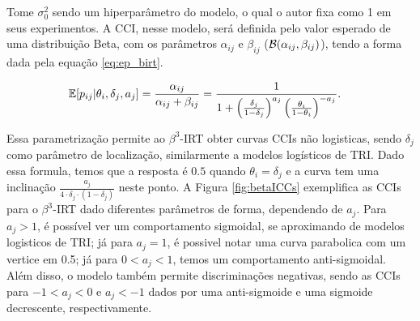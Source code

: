 \noindent Tome $\sigma_0^{2}$ sendo um hiperparâmetro do modelo, o qual o autor fixa como 1 em seus experimentos. A \gls{CCI}, nesse modelo, será definida pelo valor esperado de uma distribuição Beta, com os parâmetros $\alpha_{ij}$ e $\beta_{ij}$ (${\mathcal{B}}(\alpha_{ij}, \beta_{ij})$), tendo a forma dada pela equação \ref{eq:ep_birt}.


\begin{equation}\label{eq:ep_birt}
    \begin{split}
        {\mathbb{E}}[p_{ij}|\theta_i,\delta_j,a_j] &= \frac{\alpha_{ij}}{\alpha_{ij}+\beta_{ij}} 
        = \frac{1}{1+\left(\frac{\delta_j}{1-\delta_j}\right)^{a_j} \left(\frac{\theta_i}{1-\theta_i}\right)^{-a_j}}.
    \end{split}
\end{equation}

Essa parametrização permite ao $\beta^3$-\gls{IRT} obter curvas \gls{CCI}s não logisticas, sendo $\delta_j$ como parâmetro de localização, similarmente a modelos logísticos de \gls{TRI}. Dado essa formula, temos que a resposta é $0.5$ quando $\theta_i = \delta_j$ e a curva tem uma inclinação $\frac{a_j}{4\cdot \delta_j \cdot (1 - \delta_j)}$ neste ponto. A Figura \ref{fig:betaICCs} exemplifica as \gls{CCI}s para o $\beta^3$-\gls{IRT} dado diferentes parâmetros de forma, dependendo de $a_j$. Para $a_j > 1$, é possível ver um comportamento sigmoidal, se aproximando de modelos logisticos de \gls{TRI}; já para $a_j = 1$, é possivel notar uma curva parabolica com um vertice em 0.5; já para $0 < a_j < 1$, temos um comportamento anti-sigmoidal. Além disso, o modelo também permite discriminações negativas, sendo as \gls{CCI}s para $-1 < a_j < 0$  e $a_j < -1$ dados por uma anti-sigmoide e uma sigmoide decrescente, respectivamente.

